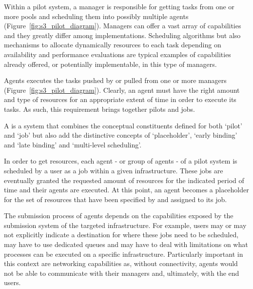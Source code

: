 \documentclass{sig-alternate}
\begin{document}

Within a pilot system, a manager is responsible for getting tasks from
one or more pools and scheduling them into possibly multiple agents
(Figure~\ref{fig:s3_pilot_diagram}). Managers can offer a vast array
of capabilities and they greatly differ among \pilotjob
implementations. Scheduling algorithms but also mechanisms to allocate
dynamically resources to each task depending on availability and
performance evaluations are typical examples of capabilities already
offered, or potentially implementable, in this type of managers.


Agents executes the tasks pushed by or pulled from one or more managers (Figure~\ref{fig:s3_pilot_diagram}). Clearly, an agent must have the right amount and type of resources for an appropriate extent of time in order to execute its tasks. As such, this requirement brings together pilots and jobs.


A \pilotjob is a system that combines the conceptual constituents
defined for both `pilot' and `job' but also add the distinctive
concepts of `placeholder', `early binding' and `late binding' and
`multi-level scheduling'. 


In order to get resources, each agent - or group of agents - of a
pilot system is scheduled by a user  as a job within a given
infrastructure. These jobs are eventually granted the requested amount
of resources for the indicated period of time and their agents are
executed. At this point, an agent becomes a placeholder for the set of
resources that have been specified by and assigned to its job.


The submission process of agents depends on the capabilities exposed
by the submission system of the targeted infrastructure. For example,
users may or may not explicitly indicate a destination for where these
jobs need to be scheduled, may have to use dedicated queues and may
have to deal with limitations on what processes can be executed on a
specific infrastructure. Particularly important in this context are
networking capabilities as, without connectivity, agents would not be
able to communicate with their managers and, ultimately, with the end
users.
\end{document}
